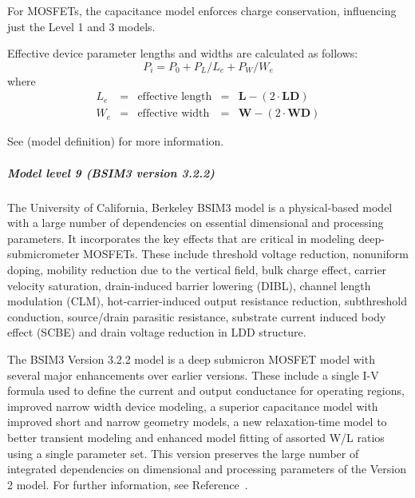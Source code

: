 For MOSFETs, the capacitance model enforces charge conservation,
influencing just the Level 1 and 3 models.

Effective device parameter lengths and widths are calculated as follows:
\[
P_i = P_0 + P_L / L_e + P_W / W_e
\]
where
\[
\begin{array}{rclcl}
L_e & = & \mbox{effective length} & = & \mathbf{L} - (2 \cdot \mathbf{LD}) \\
W_e & = & \mbox{effective width} & = & \mathbf{W} - (2 \cdot \mathbf{WD})
\end{array}
\]

See  (model definition) for more information.

\subparagraph{Model level 9 (BSIM3 version 3.2.2)}
The University of California, Berkeley BSIM3 model is a physical-based model
with a large number of dependencies on essential dimensional and processing
parameters.  It incorporates the key effects that are critical in modeling
deep-submicrometer MOSFETs.  These include threshold voltage reduction,
nonuniform doping, mobility reduction due to the vertical field, bulk charge
effect, carrier velocity saturation, drain-induced barrier lowering (DIBL),
channel length modulation (CLM), hot-carrier-induced output resistance
reduction, subthreshold conduction, source/drain parasitic resistance,
substrate current induced body effect (SCBE) and drain voltage reduction in LDD
structure.

The BSIM3 Version 3.2.2 model is a deep submicron MOSFET model with several major
enhancements over earlier versions.  These include a single I-V formula used
to define the current and output conductance for operating regions, improved
narrow width device modeling, a superior capacitance model with improved short
and narrow geometry models, a new relaxation-time model to better transient
modeling and enhanced model fitting of assorted W/L ratios using a single
parameter set.  This version preserves the large number of integrated
dependencies on dimensional and processing parameters of the Version 2 model.
For further information, see Reference~\cite{HLJHCKH}.

